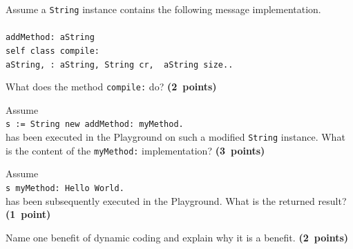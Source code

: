 \documentclass [11pt, a4wide, twoside]{article}
\begin{document}
\newpage

Assume a \texttt{String} instance contains the following message implementation.\\\\
\texttt{\hspace*{1.0cm}addMethod: aString\\
\hspace*{1.5cm}self class compile: \\
\hspace*{2.0cm}aString, \textquotesingle: aString\textquotesingle, String cr, \textquotesingle\caret~aString size.\textquotesingle.}\\

\begin{myenumerate}
\item What does the method \texttt{compile:} do? \textbf{(2~points)}

\item Assume\\
\hspace*{0.5cm}\texttt{s := String new addMethod: \textquotesingle myMethod\textquotesingle.}\\
has been executed in the Playground on such a modified \texttt{String} instance. What is the content of the \texttt{myMethod:} implementation? \textbf{(3~points)}

\item Assume\\
\hspace*{0.5cm}\texttt{s myMethod: \textquotesingle Hello World\textquotesingle.}\\
has been subsequently executed in the Playground. What is the returned result? \textbf{(1~point)}

\item Name one benefit of dynamic coding and explain why it is a benefit. \textbf{(2~points)}
\end{myenumerate}
\end{document}

